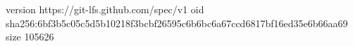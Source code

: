 version https://git-lfs.github.com/spec/v1
oid sha256:6bf3b5c05c5d5b10218f3bcbf26595c6b6bc6a67ccd6817bf16ed35e6b66aa69
size 105626
